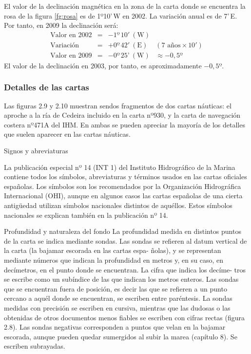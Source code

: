 \begin{ejemplo}
El valor de la declinación magnética en la zona de la carta donde se encuentra la rosa 
de la figura \ref{fg:rosa} es de 1º10’\,W en 2002. La variación anual es de 7’\,E. 
Por tanto, en 2009 la declinación será:
\[
\begin{array}{lcll}
  \mbox{Valor en 2002} & =  & -1º \, 10' \: \mathrm{(W)} \\
  \mbox{Variación}     & =  & +0º \, 42' \: \mathrm{(E)} & (\mbox{7 años} \times 10' )\\
\mbox{Valor en 2009}  &  = &   -0º \, 25’ \: \mathrm{(W)} & \approx -0,5º 
\end{array}
\]
El valor de la declinación en 2003, por tanto, es aproximadamente $-0,5º$. 
\end{ejemplo}


\subsubsection{Detalles de las cartas}

Las figuras 2.9 y 2.10 muestran sendos fragmentos de dos cartas náuticas: el aproche a la 
ría de Cedeira incluido en la carta nº930, y la carta de navegación costera nº471A del 
IHM. En ambas se pueden apreciar la mayoría de los detalles que suelen aparecer en las 
cartas náuticas. 

Signos y abreviaturas 

La publicación especial nº 14 (INT 1) del Instituto Hidrográfico de la Marina contiene 
todos los símbolos, abreviaturas y términos usados en las cartas oficiales españolas. Los 
símbolos son los recomendados por la Organización Hidrográfica Internacional (OHI), 
aunque en algunos casos las cartas españolas de una cierta antigüedad utilizan símbolos 
nacionales distintos de aquéllos. Estos símbolos nacionales se explican también en la 
publicación nº 14. 


Profundidad y naturaleza del fondo 
La profundidad medida en distintos puntos 
de la carta se indica mediante sondas. Las 
sondas se refieren al datum vertical de la 
carta (la bajamar escorada en las cartas espa- 
ñolas), y se representan mediante números 
que indican la profundidad en metros y, en su 
caso, en decímetros, en el punto donde se 
encuentran. La cifra que indica los decíme- 
tros se escribe como un subíndice de las que 
indican los metros enteros. Las sondas que se 
encuentran fuera de posición, es decir las que 
se refieren a un punto cercano a aquél donde 
se encuentran, se escriben entre paréntesis. 
La sondas medidas con precisión se escriben 
en cursiva, mientras que las dudosas o las 
obtenidas de otros documentos menos fiables 
se escriben con cifras rectas (figura 2.8). 
Las sondas negativas corresponden a 
puntos que velan en la bajamar escorada, aunque pueden quedar sumergidos al subir la 
marea (capítulo 8). Se escriben subrayadas. 

